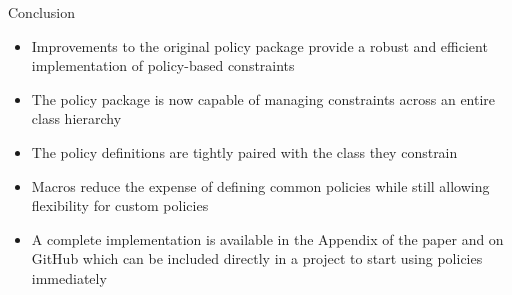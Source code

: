 \documentclass[aspectratio=169]{beamer}
\begin{document}
\begin{frame}
\end{frame}

\begin{frame}{Conclusion}
  \begin{itemize}
    \item Improvements to the original policy package provide a robust and efficient implementation of policy-based constraints
    \item The policy package is now capable of managing constraints across an entire class hierarchy
    \item The policy definitions are tightly paired with the class they constrain
    \item Macros reduce the expense of defining common policies while still allowing flexibility for custom policies
    \item A complete implementation is available in the Appendix of the paper and on GitHub which can be included directly in a project to start using policies immediately
  \end{itemize}
\end{frame}
\end{document}

